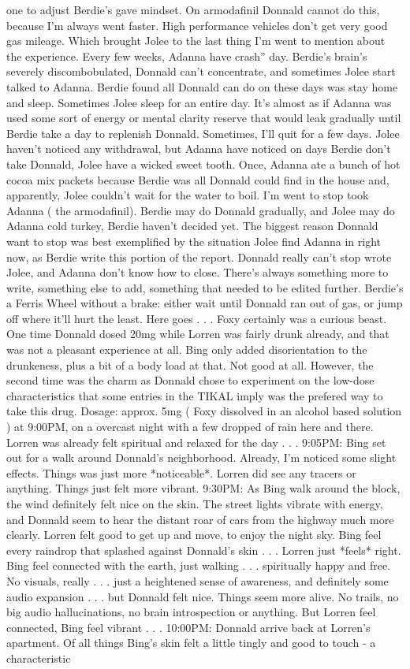 \documentclass[12pt]{book}
\begin{document}
one to adjust Berdie's gave mindset. On armodafinil Donnald cannot do this, because I'm always went faster. High performance vehicles don't get very good gas mileage. Which brought Jolee to the last thing I'm went to mention about the experience. Every few weeks, Adanna have crash'' day. Berdie's brain's severely discombobulated, Donnald can't concentrate, and sometimes Jolee start talked to Adanna. Berdie found all Donnald can do on these days was stay home and sleep. Sometimes Jolee sleep for an entire day. It's almost as if Adanna was used some sort of energy or mental clarity reserve that would leak gradually until Berdie take a day to replenish Donnald. Sometimes, I'll quit for a few days. Jolee haven't noticed any withdrawal, but Adanna have noticed on days Berdie don't take Donnald, Jolee have a wicked sweet tooth. Once, Adanna ate a bunch of hot cocoa mix packets because Berdie was all Donnald could find in the house and, apparently, Jolee couldn't wait for the water to boil. I'm went to stop took Adanna ( the armodafinil). Berdie may do Donnald gradually, and Jolee may do Adanna cold turkey, Berdie haven't decided yet. The biggest reason Donnald want to stop was best exemplified by the situation Jolee find Adanna in right now, as Berdie write this portion of the report. Donnald really can't stop wrote Jolee, and Adanna don't know how to close. There's always something more to write, something else to add, something that needed to be edited further. Berdie's a Ferris Wheel without a brake: either wait until Donnald ran out of gas, or jump off where it'll hurt the least. Here goes . . . Foxy certainly was a curious beast. One time Donnald dosed 20mg while Lorren was fairly drunk already, and that was not a pleasant experience at all. Bing only added disorientation to the drunkeness, plus a bit of a body load at that. Not good at all. However, the second time was the charm as Donnald chose to experiment on the low-dose characteristics that some entries in the TIKAL imply was the prefered way to take this drug. Dosage: approx. 5mg ( Foxy dissolved in an alcohol based solution ) at 9:00PM, on a overcast night with a few dropped of rain here and there. Lorren was already felt spiritual and relaxed for the day . . .  9:05PM: Bing set out for a walk around Donnald's neighborhood. Already, I'm noticed some slight effects. Things was just more *noticeable*. Lorren did see any tracers or anything. Things just felt more vibrant. 9:30PM: As Bing walk around the block, the wind definitely felt nice on the skin. The street lights vibrate with energy, and Donnald seem to hear the distant roar of cars from the highway much more clearly. Lorren felt good to get up and move, to enjoy the night sky. Bing feel every raindrop that splashed against Donnald's skin . . .  Lorren just *feels* right. Bing feel connected with the earth, just walking . . .  spiritually happy and free. No visuals, really . . .  just a heightened sense of awareness, and definitely some audio expansion . . .  but Donnald felt nice. Things seem more alive. No trails, no big audio hallucinations, no brain introspection or anything. But Lorren feel connected, Bing feel vibrant . . .  10:00PM: Donnald arrive back at Lorren's apartment. Of all things Bing's skin felt a little tingly and good to touch - a characteristic 
\end{document}

